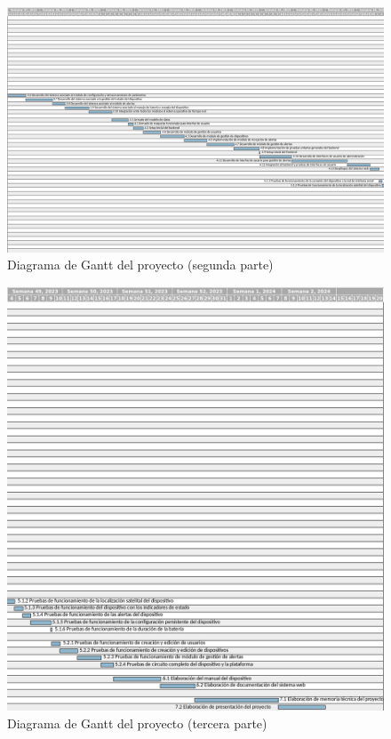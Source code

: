 \documentclass[
11pt, %
]{charter}
\begin{document}
\begin{landscape}
\begin{figure}[htpb]
\centering 
\includegraphics[width=\paperwidth]{./Figuras/Gantt2.png}
\caption{Diagrama de Gantt del proyecto (segunda parte)}
\label{fig:diagGantt2}
\end{figure}
\end{landscape}

\begin{landscape}
\begin{figure}[htpb]
\centering 
\includegraphics[height=.9\textheight]{./Figuras/Gantt3.png}
\caption{Diagrama de Gantt del proyecto (tercera parte)}
\label{fig:diagGantt3}
\end{figure}
\end{landscape}
\end{document}
